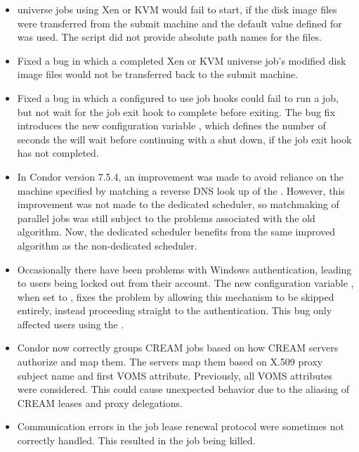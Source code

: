 \begin{itemize}
\item {} universe jobs using Xen or KVM would fail to start,
if the disk image files were transferred from the submit machine
and the default value defined for  was used.
The script did not provide absolute path names for the files.

\item Fixed a bug in which a completed Xen or KVM  universe 
job's modified disk image files would not be transferred back 
to the submit machine.

\item Fixed a bug in which a  configured to use job hooks 
could fail to run a job, 
but not wait for the job exit hook to complete before exiting.  
The bug fix introduces the new configuration variable
,
which defines the number of seconds the  will wait
before continuing with a shut down,
if the job exit hook has not completed.

\item In Condor version 7.5.4, an improvement was made to avoid reliance on
the machine specified by  
matching a reverse DNS look up of the .
However, this improvement was not made to the dedicated scheduler,
so matchmaking of parallel jobs was still subject to the
problems associated with the old algorithm.  
Now, the dedicated scheduler benefits from the same improved algorithm as the
non-dedicated scheduler.
  
\item Occasionally there have been problems with Windows 
 authentication,
leading to users being locked out from their account.
The new configuration variable ,
when set to ,
fixes the problem by allowing this mechanism to be skipped entirely,
instead proceeding straight to the  authentication. 
This bug only affected users using the . 

\item Condor now correctly groups CREAM jobs based on how CREAM servers 
authorize and map them.
The servers map them based on X.509 proxy subject name 
and first VOMS attribute. 
Previously, all VOMS attributes were considered.
This could cause unexpected behavior due to the aliasing of CREAM leases
and proxy delegations.

\item Communication errors in the job lease renewal protocol were
sometimes not correctly handled.  This resulted in the job being
killed.

\end{itemize}

